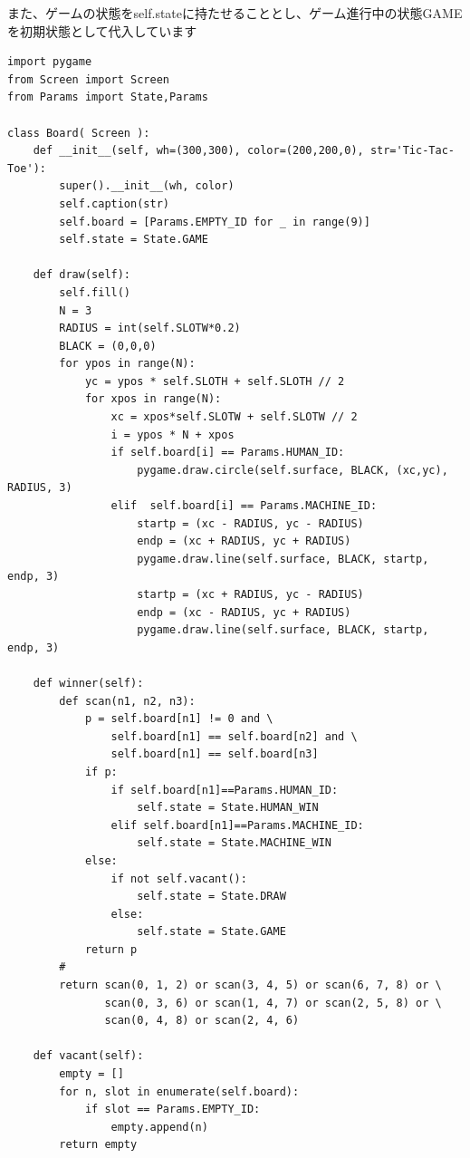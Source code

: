 \documentclass[uplatex,a4paper,11pt,oneside,openany]{jsbook}
\begin{document}
また、ゲームの状態をself.stateに持たせることとし、ゲーム進行中の状態GAMEを初期状態として代入しています

\begin{lstlisting}[caption=class Board,label=prog05-1]
import pygame
from Screen import Screen
from Params import State,Params

class Board( Screen ):
    def __init__(self, wh=(300,300), color=(200,200,0), str='Tic-Tac-Toe'):
        super().__init__(wh, color)
        self.caption(str)
        self.board = [Params.EMPTY_ID for _ in range(9)]
        self.state = State.GAME

    def draw(self):
        self.fill()
        N = 3
        RADIUS = int(self.SLOTW*0.2)
        BLACK = (0,0,0)
        for ypos in range(N):
            yc = ypos * self.SLOTH + self.SLOTH // 2
            for xpos in range(N):
                xc = xpos*self.SLOTW + self.SLOTW // 2
                i = ypos * N + xpos
                if self.board[i] == Params.HUMAN_ID:
                    pygame.draw.circle(self.surface, BLACK, (xc,yc), RADIUS, 3)
                elif  self.board[i] == Params.MACHINE_ID:
                    startp = (xc - RADIUS, yc - RADIUS)
                    endp = (xc + RADIUS, yc + RADIUS)
                    pygame.draw.line(self.surface, BLACK, startp, endp, 3)
                    startp = (xc + RADIUS, yc - RADIUS)
                    endp = (xc - RADIUS, yc + RADIUS)
                    pygame.draw.line(self.surface, BLACK, startp, endp, 3)

    def winner(self):
        def scan(n1, n2, n3):
            p = self.board[n1] != 0 and \
                self.board[n1] == self.board[n2] and \
                self.board[n1] == self.board[n3]
            if p:
                if self.board[n1]==Params.HUMAN_ID:
                    self.state = State.HUMAN_WIN
                elif self.board[n1]==Params.MACHINE_ID:
                    self.state = State.MACHINE_WIN
            else:
                if not self.vacant():
                    self.state = State.DRAW
                else:
                    self.state = State.GAME
            return p
        #
        return scan(0, 1, 2) or scan(3, 4, 5) or scan(6, 7, 8) or \
               scan(0, 3, 6) or scan(1, 4, 7) or scan(2, 5, 8) or \
               scan(0, 4, 8) or scan(2, 4, 6)

    def vacant(self):
        empty = []
        for n, slot in enumerate(self.board):
            if slot == Params.EMPTY_ID:
                empty.append(n)
        return empty
\end{lstlisting}%
\end{document}
